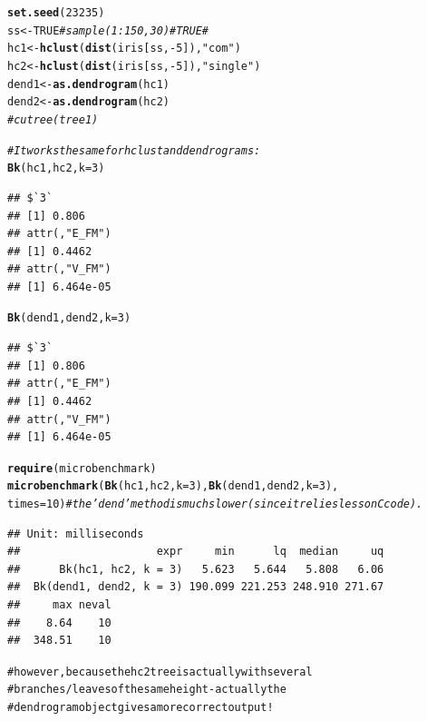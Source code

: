 \documentclass[shortnames,nojss,article]{jss}\usepackage[]{graphicx}\usepackage[]{color}
\makeatletter
\newcommand{\hlnum}[1]{\textcolor[rgb]{0.686,0.059,0.569}{#1}}%
\newcommand{\hlstr}[1]{\textcolor[rgb]{0.192,0.494,0.8}{#1}}%
\newcommand{\hlcom}[1]{\textcolor[rgb]{0.678,0.584,0.686}{\textit{#1}}}%
\newcommand{\hlopt}[1]{\textcolor[rgb]{0,0,0}{#1}}%
\newcommand{\hlstd}[1]{\textcolor[rgb]{0.345,0.345,0.345}{#1}}%
\newcommand{\hlkwb}[1]{\textcolor[rgb]{0.69,0.353,0.396}{#1}}%
\newcommand{\hlkwc}[1]{\textcolor[rgb]{0.333,0.667,0.333}{#1}}%
\newcommand{\hlkwd}[1]{\textcolor[rgb]{0.737,0.353,0.396}{\textbf{#1}}}%
\newenvironment{kframe}{%
 \def\at@end@of@kframe{}%
 \ifinner\ifhmode%
  \def\at@end@of@kframe{\end{minipage}}%
  \begin{minipage}{\columnwidth}%
 \fi\fi%
 \def\FrameCommand##1{\hskip\@totalleftmargin \hskip-\fboxsep
 \colorbox{shadecolor}{##1}\hskip-\fboxsep
     \hskip-\linewidth \hskip-\@totalleftmargin \hskip\columnwidth}%
 \MakeFramed {\advance\hsize-\width
   \@totalleftmargin\z@ \linewidth\hsize
   \@setminipage}}%
 {\par\unskip\endMakeFramed%
 \at@end@of@kframe}
\newenvironment{knitrout}{}{} %
\makeatother
\begin{document}
\begin{knitrout}
\color{fgcolor}\begin{kframe}
\begin{alltt}
\hlkwd{set.seed}\hlstd{(}\hlnum{23235}\hlstd{)}
\hlstd{ss} \hlkwb{<-} \hlnum{TRUE}  \hlcom{# sample(1:150, 30 ) # TRUE #}
\hlstd{hc1} \hlkwb{<-} \hlkwd{hclust}\hlstd{(}\hlkwd{dist}\hlstd{(iris[ss,} \hlopt{-}\hlnum{5}\hlstd{]),} \hlstr{"com"}\hlstd{)}
\hlstd{hc2} \hlkwb{<-} \hlkwd{hclust}\hlstd{(}\hlkwd{dist}\hlstd{(iris[ss,} \hlopt{-}\hlnum{5}\hlstd{]),} \hlstr{"single"}\hlstd{)}
\hlstd{dend1} \hlkwb{<-} \hlkwd{as.dendrogram}\hlstd{(hc1)}
\hlstd{dend2} \hlkwb{<-} \hlkwd{as.dendrogram}\hlstd{(hc2)}
\hlcom{# cutree(tree1)}

\hlcom{# It works the same for hclust and dendrograms:}
\hlkwd{Bk}\hlstd{(hc1, hc2,} \hlkwc{k} \hlstd{=} \hlnum{3}\hlstd{)}
\end{alltt}
\begin{verbatim}
## $`3`
## [1] 0.806
## attr(,"E_FM")
## [1] 0.4462
## attr(,"V_FM")
## [1] 6.464e-05
\end{verbatim}
\begin{alltt}
\hlkwd{Bk}\hlstd{(dend1, dend2,} \hlkwc{k} \hlstd{=} \hlnum{3}\hlstd{)}
\end{alltt}
\begin{verbatim}
## $`3`
## [1] 0.806
## attr(,"E_FM")
## [1] 0.4462
## attr(,"V_FM")
## [1] 6.464e-05
\end{verbatim}
\begin{alltt}
\hlkwd{require}\hlstd{(microbenchmark)}
\hlkwd{microbenchmark}\hlstd{(}\hlkwd{Bk}\hlstd{(hc1, hc2,} \hlkwc{k} \hlstd{=} \hlnum{3}\hlstd{),} \hlkwd{Bk}\hlstd{(dend1, dend2,} \hlkwc{k} \hlstd{=} \hlnum{3}\hlstd{),}
    \hlkwc{times} \hlstd{=} \hlnum{10}\hlstd{)}  \hlcom{# the 'dend' method is much slower (since it relies less on C code).}
\end{alltt}
\begin{verbatim}
## Unit: milliseconds
##                     expr     min      lq  median     uq
##      Bk(hc1, hc2, k = 3)   5.623   5.644   5.808   6.06
##  Bk(dend1, dend2, k = 3) 190.099 221.253 248.910 271.67
##     max neval
##    8.64    10
##  348.51    10
\end{verbatim}
\begin{alltt}

# however, because the hc2 tree is actually with several
# branches/leaves of the same height - actually the
# dendrogram object gives a more correct output!

\end{alltt}
\end{kframe}
\end{knitrout}
\end{document}
